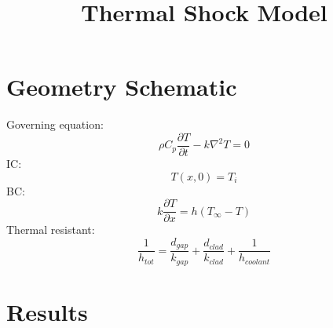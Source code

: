 \documentclass[12pt]{article}
\begin{document}
 
\title{Thermal Shock Model }
\maketitle
\section{Geometry Schematic} 

Governing equation: 
\[\rho C_p \frac{\partial T}{\partial t} - k \nabla^2 T = 0 \]
IC:
\[T(x,0) = T_i\]
BC:
\[k\frac{\partial T}{\partial x} = h(T_{\infty} - T) \]
Thermal resistant:
\[\frac{1}{h_{tot}} = \frac{d_{gap}}{k_{gap}} + \frac{d_{clad}}{k_{clad}} + \frac{1}{h_{coolant}}\]
\begin{figure}[h]
\centering
\label{1d}
\end{figure}

\pagebreak

\section{Results}
\end{document}

